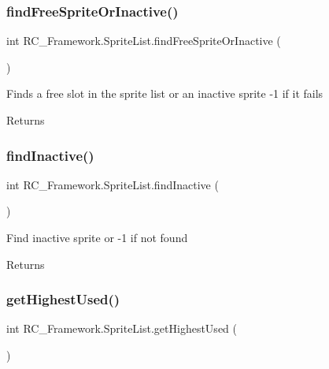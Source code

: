 \subsubsection{\texorpdfstring{find\+Free\+Sprite\+Or\+Inactive()}{findFreeSpriteOrInactive()}}
{\footnotesize\ttfamily int R\+C\+\_\+\+Framework.\+Sprite\+List.\+find\+Free\+Sprite\+Or\+Inactive (\begin{DoxyParamCaption}{ }\end{DoxyParamCaption})}



Finds a free slot in the sprite list or an inactive sprite -\/1 if it fails 

\begin{DoxyReturn}{Returns}

\end{DoxyReturn}
\mbox{\label{class_r_c___framework_1_1_sprite_list_a737c9d5cc39dbb8c3754b2fd6d67e8ab}} 
\subsubsection{\texorpdfstring{find\+Inactive()}{findInactive()}}
{\footnotesize\ttfamily int R\+C\+\_\+\+Framework.\+Sprite\+List.\+find\+Inactive (\begin{DoxyParamCaption}{ }\end{DoxyParamCaption})}



Find inactive sprite or -\/1 if not found 

\begin{DoxyReturn}{Returns}

\end{DoxyReturn}
\mbox{\label{class_r_c___framework_1_1_sprite_list_aad3ba75650382840c4c11d28022bc288}} 
\subsubsection{\texorpdfstring{get\+Highest\+Used()}{getHighestUsed()}}
{\footnotesize\ttfamily int R\+C\+\_\+\+Framework.\+Sprite\+List.\+get\+Highest\+Used (\begin{DoxyParamCaption}{ }\end{DoxyParamCaption})}



